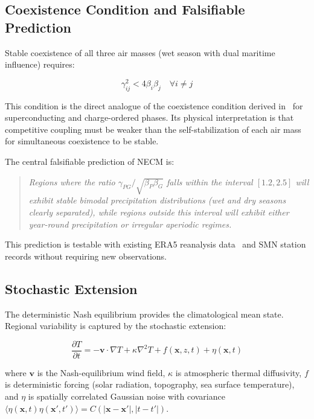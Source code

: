 \documentclass[gmd, manuscript]{copernicus}
\begin{document}
\subsection{Coexistence Condition and Falsifiable Prediction}

Stable coexistence of all three air masses (wet season with dual
maritime influence) requires:

\begin{equation}
\gamma_{ij}^2 < 4\beta_i\beta_j \quad \forall i \neq j
\end{equation}

This condition is the direct analogue of the coexistence condition
derived in~\citet{CastilloSanchez2026} for superconducting and
charge-ordered phases. Its physical interpretation is that competitive
coupling must be weaker than the self-stabilization of each air mass
for simultaneous coexistence to be stable.

The central falsifiable prediction of NECM is:

\begin{quote}
\textit{Regions where the ratio $\gamma_{PG}/\sqrt{\beta_P\beta_G}$
falls within the interval $[1.2, 2.5]$ will exhibit stable bimodal
precipitation distributions (wet and dry seasons clearly separated),
while regions outside this interval will exhibit either year-round
precipitation or irregular aperiodic regimes.}
\end{quote}

This prediction is testable with existing ERA5 reanalysis data~\citep{Hersbach2020, Beck2020} and
SMN station records without requiring new observations.

\subsection{Stochastic Extension}

The deterministic Nash equilibrium provides the climatological mean
state. Regional variability is captured by the stochastic extension:

\begin{equation}
\frac{\partial T}{\partial t} = -\mathbf{v}\cdot\nabla T
  + \kappa\nabla^2 T + f(\mathbf{x},z,t) + \eta(\mathbf{x},t)
\end{equation}

where $\mathbf{v}$ is the Nash-equilibrium wind field, $\kappa$ is
atmospheric thermal diffusivity, $f$ is deterministic forcing
(solar radiation, topography, sea surface temperature), and $\eta$
is spatially correlated Gaussian noise with covariance
$\langle\eta(\mathbf{x},t)\eta(\mathbf{x}',t')\rangle =
C(|\mathbf{x}-\mathbf{x}'|, |t-t'|)$.
\end{document}
